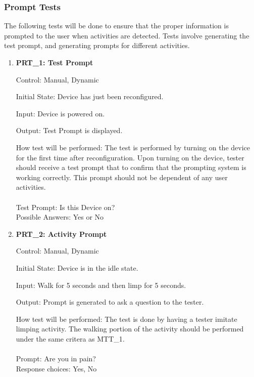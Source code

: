 \documentclass[12pt, titlepage]{article}
\begin{document}
\newpage
\subsubsection{Prompt Tests}

The following tests will be done to ensure that the proper information is prompted to the user when activities are detected. Tests involve generating the test prompt, and generating prompts for different activities.

\begin{enumerate}
	\item{\textbf{PRT\_1: Test Prompt} \\}\label{PRT1}
	
		Control: Manual, Dynamic
							
		Initial State: Device has just been reconfigured.
							
		Input: Device is powered on.
		
		Output: Test Prompt is displayed.

		How test will be performed: The test is performed by turning on the device for the first time after reconfiguration. Upon turning on the device, tester should receive a test prompt that to confirm that the prompting system is working correctly. This prompt should not be dependent of any user activities.\\\\
		Test Prompt: Is this Device on?\\
		Possible Answers: Yes or No
		
	\item{\textbf{PRT\_2: Activity Prompt} \\}\label{PRT2}
	
		Control: Manual, Dynamic
							
		Initial State: Device is in the idle state.
							
		Input: Walk for 5 seconds and then limp for 5 seconds.
		
		Output: Prompt is generated to ask a question to the tester.
							
		How test will be performed: The test is done by having a tester imitate limping activity. The walking portion of the activity should be performed under the same critera as MTT\_1.\\\\
		Prompt: Are you in pain?\\
		Response choices: Yes, No
\end{enumerate}
\end{document}
